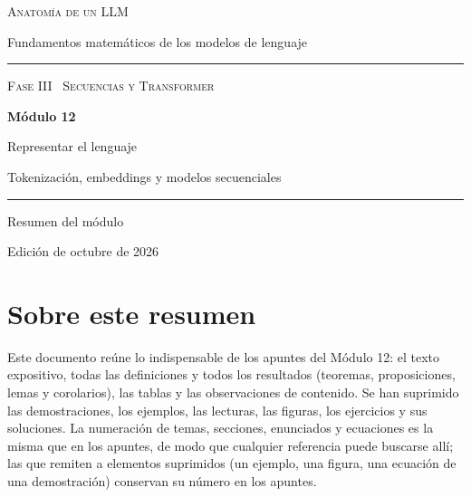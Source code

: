\documentclass[11pt,a4paper,twoside,openany]{book}
\begin{document}
\frontmatter
\begin{titlepage}
\centering
\vspace*{2.5cm}
{\large\scshape Anatomía de un LLM}\par
\vspace{0.4cm}
{\normalsize Fundamentos matemáticos de los modelos de lenguaje}\par
\vspace{2.2cm}
\rule{\textwidth}{0.8pt}\par\vspace{0.5cm}
{\small\scshape Fase III \textperiodcentered\ Secuencias y Transformer}\par\vspace{0.3cm}
{\Huge\bfseries Módulo 12\par}\vspace{0.3cm}
{\LARGE Representar el lenguaje\par}
\vspace{0.2cm}
{\large Tokenización, embeddings y modelos secuenciales\par}
\vspace{0.5cm}\rule{\textwidth}{0.4pt}\par
\vspace{1.6cm}
{\large Resumen del módulo}\par
\vfill
{\small Edición de octubre de 2026}\par
\end{titlepage}

\chapter*{Sobre este resumen}

Este documento reúne lo indispensable de los apuntes del Módulo 12: el texto expositivo, todas las definiciones y todos los resultados (teoremas, proposiciones, lemas y corolarios), las tablas y las observaciones de contenido. Se han suprimido las demostraciones, los ejemplos, las lecturas, las figuras, los ejercicios y sus soluciones. La numeración de temas, secciones, enunciados y ecuaciones es la misma que en los apuntes, de modo que cualquier referencia puede buscarse allí; las que remiten a elementos suprimidos (un ejemplo, una figura, una ecuación de una demostración) conservan su número en los apuntes.
\end{document}
